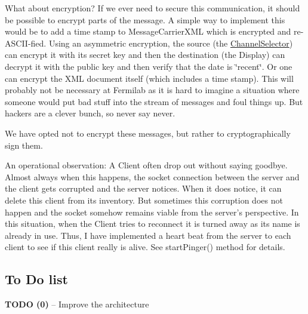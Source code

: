What about encryption? If we ever need to secure this communication, it should be possible to encrypt parts of the message. A simple way to implement this would be to add a time stamp to Message\-Carrier\-X\-M\-L which is encrypted and re-\/\-A\-S\-C\-I\-I-\/fied. Using an asymmetric encryption, the source (the \hyperlink{classgov_1_1fnal_1_1ppd_1_1dd_1_1ChannelSelector}{Channel\-Selector}) can encrypt it with its secret key and then the destination (the Display) can decrypt it with the public key and then verify that the date is \char`\"{}recent\char`\"{}. Or one can encrypt the X\-M\-L document itself (which includes a time stamp). This will probably not be necessary at Fermilab as it is hard to imagine a situation where someone would put bad stuff into the stream of messages and foul things up. But hackers are a clever bunch, so never say never. 

We have opted not to encrypt these messages, but rather to cryptographically sign them. 

An operational observation\-: A Client often drop out without saying goodbye. Almost always when this happens, the socket connection between the server and the client gets corrupted and the server notices. When it does notice, it can delete this client from its inventory. But sometimes this corruption does not happen and the socket somehow remains viable from the server's perspective. In this situation, when the Client tries to reconnect it is turned away as its name is already in use. Thus, I have implemented a heart beat from the server to each client to see if this client really is alive. See start\-Pinger() method for details. 

\subsection*{To Do list}

{\bfseries T\-O\-D\-O (0)} -- Improve the architecture 

